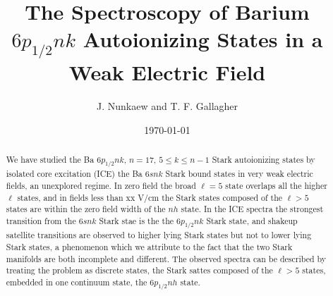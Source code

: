 \documentclass[aps,pra,groupedaddress,showpacs,preprint,doubled-space]{revtex4}
\begin{document}
\title{{\bf The Spectroscopy of Barium $6p_{1/2}nk$ Autoionizing States in a Weak Electric Field}}
\author{J. Nunkaew and T. F. Gallagher}
\date{\today}
\begin{abstract}
\label{abst}
We have studied the Ba $6p_{1/2}nk$, $n=17$,
$5\leq k\leq n-1$ Stark autoionizing states by isolated
core excitation (ICE) the Ba $6snk$ Stark bound states in very weak electric fields, an unexplored regime. In zero field the broad $\ell=5$ state overlaps all the higher $\ell$ states, and in fields less than xx V/cm the Stark states composed of the $\ell>5$ states are within the zero field width of the $nh$ state. In the ICE spectra the strongest transition from the $6snk$ Stark stae is the the $6p_{1/2}nk$ Stark state, and shakeup satellite transitions are observed to higher lying Stark states but not to lower lying Stark states, a phenomenon which we attribute to the fact that the two Stark manifolds are both incomplete and different. The observed spectra can be described by treating the problem as discrete states, the Stark sattes composed of the $\ell>5$ states, embedded in one continuum state, the $6p_{1/2}nh$ state.
\end{abstract}
\pacs{}
\maketitle
\end{document}
